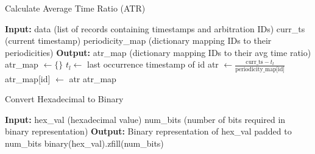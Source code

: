 \documentclass{article}
\begin{document}
    \begin{algorithm}
        \caption{Calculate Average Time Ratio (ATR)}
        \label{alg:calculate_atr}
        \begin{algorithmic}[1]
        \State \textbf{Input:} 
        \State \hspace{\algorithmicindent} data (list of records containing timestamps and arbitration IDs)
        \State \hspace{\algorithmicindent} curr\_ts (current timestamp)
        \State \hspace{\algorithmicindent} periodicity\_map (dictionary mapping IDs to their periodicities)
        \State \textbf{Output:} atr\_map (dictionary mapping IDs to their avg time ratio)
        \State atr\_map $\gets \{\}$ 
            \State $t_l \gets$ last occurrence timestamp of id
            \State atr $\gets \frac{\text{curr\_ts} - t_l}{\text{periodicity\_map[id]}}$
            \State atr\_map[id] $\gets$ atr
        \EndFor
        \State \Return atr\_map
        \EndProcedure
        \end{algorithmic}
        \end{algorithm}

        
\begin{algorithm}
    \caption{Convert Hexadecimal to Binary}
    \label{alg:hex_to_bin}
    \begin{algorithmic}[1]
    \State \textbf{Input:}
    \State \hspace{\algorithmicindent} hex\_val (hexadecimal value)
    \State \hspace{\algorithmicindent} num\_bits (number of bits required in binary representation)
    \State \textbf{Output:} Binary representation of hex\_val padded to num\_bits
    \State \Return binary(hex\_val).zfill(num\_bits)
    \EndProcedure
    \end{algorithmic}
    \end{algorithm}
\end{document}
